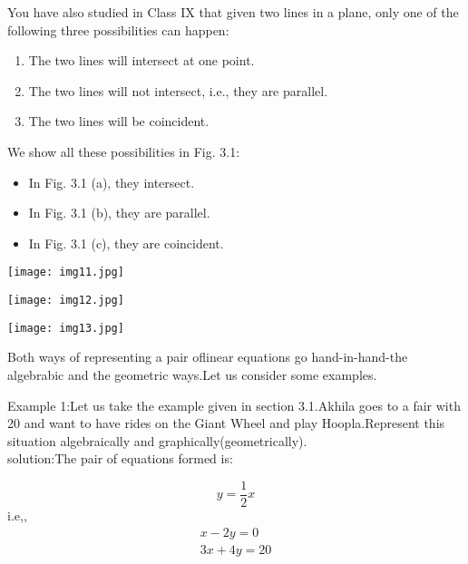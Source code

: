 \documentclass{article}
\begin{document}
{\hspace{1.5em}You have also studied in Class IX that given two lines in a plane, only one of the following three possibilities can happen:

\begin{enumerate}[label=(\roman*)]
    \item The two lines will intersect at one point.
    \item The two lines will not intersect, i.e., they are parallel.
    \item The two lines will be coincident.
\end{enumerate}
\noindent
We show all these possibilities in Fig. 3.1:

\begin{itemize}
    \item In Fig. 3.1 (a), they intersect.
    \item In Fig. 3.1 (b), they are parallel.
    \item In Fig. 3.1 (c), they are coincident.
\end{itemize}
}
\newpage
\begin{minipage}{0.3\textwidth}
    \texttt{[image: img11.jpg]}
\end{minipage}
\hspace{0\textwidth}
\begin{minipage}{0.3\textwidth}
    \texttt{[image: img12.jpg]} 
\end{minipage}
\begin{minipage}{0.3\textwidth}
    \texttt{[image: img13.jpg]}
\end{minipage}

{\fontsize{13}{16}\selectfont
Both ways of representing a pair oflinear equations go hand-in-hand-the algebrabic and the geometric ways.Let us consider some examples.
\vspace{1em}

\noindent
\textcolor{ncertcyan}{Example 1:}Let us take the example given in section 3.1.Akhila goes to a fair with 20 and want to have rides on the Giant Wheel and play Hoopla.Represent this situation algebraically and graphically(geometrically).\\
\textcolor{ncertcyan}{solution:}The pair of equations formed is:}
  \begin{equation*}
y=\frac{1}{2}x
  \end{equation*}
i.e,,
   \begin{align}
x-2y=0 \\
3x+4y=20
   \end{align}
\end{document}
